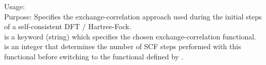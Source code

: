 {
 \noindent
 Usage:    \\[1.0ex]
 Purpose: Specifies the exchange-correlation approach used during the initial steps of a self-consistent DFT / Hartree-Fock. \\[1.0ex]
  is a keyword (string) which specifies the chosen
    exchange-correlation functional. \\
  is an integer that determines the number of SCF steps performed with this functional before switching to the functional defined by .
}
